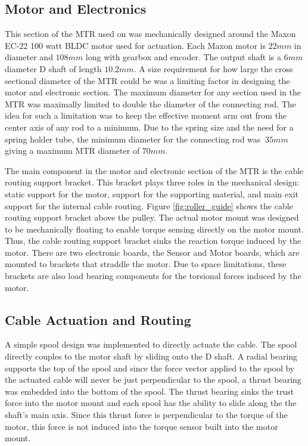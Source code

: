 \subsection{Motor and Electronics}
\label{mechanical:motor}
This section of the MTR used on \SB{} was mechanically designed around the Maxon EC-22 100 watt BLDC motor used for actuation. 
Each Maxon motor is \(22 mm\) in diameter and \(108 mm\) long with gearbox and encoder.
The output shaft is a \(6 mm\) diameter D shaft of length \(10.2 mm\).
A size requirement for how large the cross sectional diameter of the MTR could be was a limiting factor in designing the motor and electronic section.
The maximum diameter for any section used in the MTR was maximally limited to double the diameter of the connecting rod.
The idea for such a limitation was to keep the effective moment arm out from the center axis of any rod to a minimum.  
Due to the spring size and the need for a spring holder tube, the minimum diameter for the connecting rod was \(~35mm\) giving a maximum MTR diameter of \(70mm\).

The main component in the motor and electronic section of the MTR is the cable routing support bracket. 
This bracket plays three roles in the mechanical design: static support for the motor, support for the supporting material, and main exit support for the internal cable routing.
Figure \ref{fig:roller_guide} shows the cable routing support bracket above the pulley.
The actual motor mount was designed to be mechanically floating to enable torque sensing directly on the motor mount.
Thus, the cable routing support bracket sinks the reaction torque induced by the motor.
There are two electronic boards, the Sensor and Motor boards, which are mounted to brackets that straddle the motor.
Due to space limitations, these brackets are also load bearing components for the torsional forces induced by the motor.

\subsection{Cable Actuation and Routing}
\label{routing}
A simple spool design was implemented to directly actuate the cable. 
The spool directly couples to the motor shaft by sliding onto the D shaft.
A radial bearing supports the top of the spool and since the force vector applied to the spool by the actuated cable will never be just perpendicular to the spool, a thrust bearing was embedded into the bottom of the spool.
The thrust bearing sinks the trust force into the motor mount and each spool has the ability to slide along the the shaft's main axis. 
Since this thrust force is perpendicular to the torque of the motor, this force is not induced into the torque sensor built into the motor mount.

